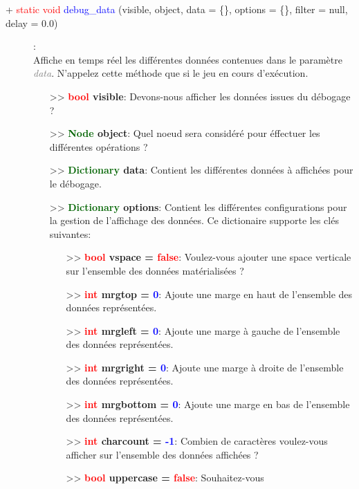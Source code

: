 \documentclass[a4paper, 11pt]{article}
\begin{document}
	\newpage \begin{description}
		\item [+ \textcolor{red}{static void} \textcolor{blue}{debug\_data} (visible, object, data = \{\}, 
		options = \{\}, filter = null, delay = 0.0)]: \\Affiche en temps réel les différentes données 
		contenues dans le paramètre \textit{\textcolor{gray}{data}}. N'appelez cette méthode que si le jeu 
		en cours d'exécution.
		\begin{itemize}
			\item[>> \textbf{\textcolor{red}{bool} visible}:] Devons-nous afficher les données issues du
			débogage ?
			\item [>> \textbf{\textcolor{darkgreen}{Node} object}:] Quel noeud sera considéré pour éffectuer 
			les différentes opérations ?
			\item[>> \textbf{\textcolor{darkgreen}{Dictionary} data}:] Contient les différentes données à
			affichées pour le débogage.
			\item[>> \textbf{\textcolor{darkgreen}{Dictionary} options}:] Contient les différentes 
			configurations pour la gestion de l'affichage des données. Ce dictionaire supporte les clés 
			suivantes:
			\begin{itemize}
				\item[>> \textbf{\textcolor{red}{bool} vspace = \textcolor{red}{false}}:] Voulez-vous 
				ajouter une space verticale sur l'ensemble des données matérialisées ?
				\item[>> \textbf{\textcolor{red}{int} mrgtop = \textcolor{blue}{0}}:] Ajoute une marge en 
				haut de l'ensemble des données représentées.
				\item[>> \textbf{\textcolor{red}{int} mrgleft = \textcolor{blue}{0}}:] Ajoute une marge à 
				gauche de l'ensemble des données représentées.
				\item[>> \textbf{\textcolor{red}{int} mrgright = \textcolor{blue}{0}}:] Ajoute une marge à 
				droite de l'ensemble des données représentées.
				\item[>> \textbf{\textcolor{red}{int} mrgbottom = \textcolor{blue}{0}}:] Ajoute une marge en 
				bas de l'ensemble des données représentées.
				\item[>> \textbf{\textcolor{red}{int} charcount = \textcolor{blue}{-1}}:] Combien de 
				caractères voulez-vous afficher sur l'ensemble des données affichées ?
				\item[>> \textbf{\textcolor{red}{bool} uppercase = \textcolor{red}{false}}:] Souhaitez-vous

\end{itemize}
\end{itemize}
\end{description}
\end{document}
